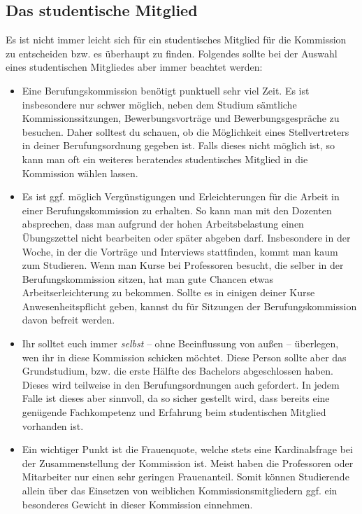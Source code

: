 \subsection{Das studentische Mitglied}
Es ist nicht immer leicht sich für ein studentisches Mitglied für die Kommission zu entscheiden bzw. es überhaupt zu finden. Folgendes sollte bei der Auswahl eines studentischen Mitgliedes aber immer beachtet werden:
\begin{itemize}
    \item Eine Berufungskommission benötigt punktuell sehr viel Zeit. Es ist insbesondere nur schwer möglich, neben dem Studium sämtliche Kommissionssitzungen, Bewerbungsvorträge und Bewerbungsgespräche zu besuchen. Daher solltest du schauen, ob die Möglichkeit eines Stellvertreters in deiner Berufungsordnung gegeben ist. Falls dieses nicht möglich ist, so kann man oft ein weiteres beratendes studentisches Mitglied in die Kommission wählen lassen.

    \item Es ist ggf. möglich Vergünstigungen und Erleichterungen für die Arbeit in einer Berufungskommission zu erhalten. So kann man mit den Dozenten absprechen, dass man aufgrund der hohen Arbeitsbelastung einen Übungszettel nicht bearbeiten oder später abgeben darf. Insbesondere in der Woche, in der die Vorträge und Interviews stattfinden, kommt man kaum zum Studieren. Wenn man Kurse bei Professoren besucht, die selber in der Berufungskommission sitzen, hat man gute Chancen etwas Arbeitserleichterung zu bekommen. Sollte es in einigen deiner Kurse Anwesenheitspflicht geben, kannst du für Sitzungen der Berufungskommission davon befreit werden.

    \item Ihr solltet euch immer \emph{selbst} -- ohne Beeinflussung von außen -- überlegen, wen ihr in diese Kommission schicken möchtet. Diese Person sollte aber das Grundstudium, bzw. die erste Hälfte des Bachelors abgeschlossen haben. Dieses wird teilweise in den Berufungsordnungen auch gefordert. In jedem Falle ist dieses aber sinnvoll, da so sicher gestellt wird, dass bereits eine genügende Fachkompetenz und Erfahrung beim studentischen Mitglied vorhanden ist.

    \item Ein wichtiger Punkt ist die Frauenquote, welche stets eine Kardinalsfrage bei der Zusammenstellung der Kommission ist. Meist haben die Professoren oder Mitarbeiter nur einen sehr geringen Frauenanteil. Somit können Studierende allein über das Einsetzen von weiblichen Kommissionsmitgliedern ggf. ein besonderes Gewicht in dieser Kommission einnehmen.
\end{itemize}

